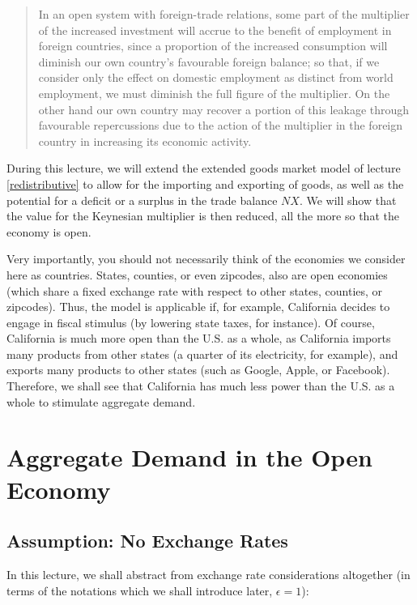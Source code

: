 \documentclass[]{book}
\begin{document}
\begin{quote}
In an open system with foreign-trade relations, some part of the
multiplier of the increased investment will accrue to the benefit of
employment in foreign countries, since a proportion of the increased
consumption will diminish our own country's favourable foreign balance;
so that, if we consider only the effect on domestic employment as
distinct from world employment, we must diminish the full figure of the
multiplier. On the other hand our own country may recover a portion of
this leakage through favourable repercussions due to the action of the
multiplier in the foreign country in increasing its economic activity.
\end{quote}

During this lecture, we will extend the extended goods market model of
lecture \ref{redistributive} to allow for the importing and exporting of
goods, as well as the potential for a deficit or a surplus in the trade
balance \(NX\). We will show that the value for the Keynesian multiplier
is then reduced, all the more so that the economy is open.

Very importantly, you should not necessarily think of the economies we
consider here as countries. States, counties, or even zipcodes, also are
open economies (which share a fixed exchange rate with respect to other
states, counties, or zipcodes). Thus, the model is applicable if, for
example, California decides to engage in fiscal stimulus (by lowering
state taxes, for instance). Of course, California is much more open than
the U.S. as a whole, as California imports many products from other
states (a quarter of its electricity, for example), and exports many
products to other states (such as Google, Apple, or Facebook).
Therefore, we shall see that California has much less power than the
U.S. as a whole to stimulate aggregate demand.

\section{Aggregate Demand in the Open
Economy}\label{aggregate-demand-in-the-open-economy}

\subsection{Assumption: No Exchange
Rates}\label{assumption-no-exchange-rates}

In this lecture, we shall abstract from exchange rate considerations
altogether (in terms of the notations which we shall introduce later,
\(\epsilon=1\)):
\end{document}

